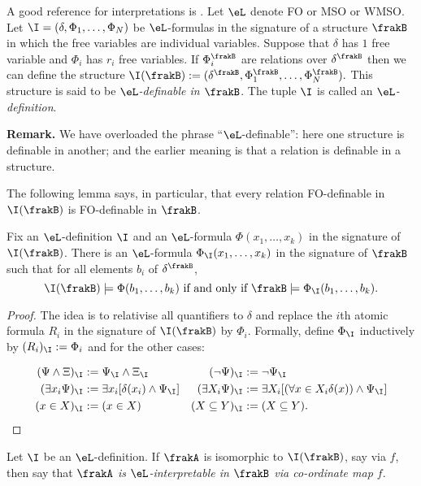 A good reference for interpretations is \cite{Hodg93}.
Let $\eL$ denote FO or MSO or WMSO. Let  $\I = (\delta, \Phi_1, \dots, \Phi_N)$ be $\eL$-formulas in the signature of a structure $\frakB$ in 
which the free variables are individual variables.
Suppose that $\delta$ has $1$ free variable and $\Phi_i$ has $r_i$ free variables.
If $\Phi_i^\frakB$ are relations over $\delta^\frakB$ then we can define the structure 
$\I(\frakB) := (\delta^\frakB, \Phi_1^\frakB, \dots, \Phi_N^\frakB).$ 
This structure is said to be {\em $\eL$-definable in $\frakB$}. The tuple $\I$ is called an {\em $\eL$-definition}.

{\bf Remark.} We have overloaded the phrase ``$\eL$-definable'': here one structure is definable in another; 
and the earlier meaning is that a relation is definable in a structure.

The following lemma says, in particular, that every relation FO-definable in $\I(\frakB)$ is 
FO-definable in $\frakB$.

\begin{lemma} \label{AS:lem:translation} 
Fix an $\eL$-definition $\I$ and an $\eL$-formula $\Phi(x_1,\dots,x_k)$ in the signature of $\I(\frakB)$.
There is an $\eL$-formula $\Phi_\I(x_1,\dots,x_k)$ in the signature of $\frakB$ such that for all elements $b_i$ of $\delta^\frakB$,
\[
\I(\frakB) \models \Phi(b_1,\dots,b_k) \mbox{ if and only if } \frakB \models \Phi_\I(b_1,\dots,b_k).
\]
\end{lemma}

\begin{proof}
The idea is to relativise all quantifiers to $\delta$ and replace the $i$th atomic formula $R_i$ in the signature of $\I(\frakB)$ 
by $\Phi_i$.
Formally, define $\Phi_\I$ inductively by $(R_i)_\I := \Phi_i$ and for the other cases:

\begin{align*}
(\Psi \wedge \Xi)_\I & := \Psi_\I \wedge \Xi_\I  					&(\neg \Psi)_\I & := \neg \Psi_\I \\
(\exists x_i \Psi)_\I & := \exists x_i [\delta(x_i) \wedge \Psi_\I]  		&(\exists X_i \Psi)_\I & := \exists X_i [(\forall x \in X_i \delta(x)) \wedge \Psi_\I]\\
(x \in X)_\I &:= (x \in X)  & (X \subseteq Y)_\I &:= (X \subseteq Y) .
\end{align*}
\end{proof}

\begin{definition}
Let $\I$ be an $\eL$-definition. If $\frakA$ is isomorphic to $\I(\frakB)$, say via $f$, then say that {\em $\frakA$ is  $\eL$-interpretable in $\frakB$ via co-ordinate map $f$}.
\end{definition}

